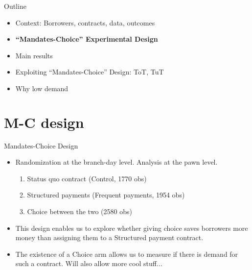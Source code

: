 \documentclass[9pt, aspectratio=169]{beamer}
\begin{document}
\begin{frame}{Outline}
     \large   
     \begin{itemize}
        \item Context: Borrowers, contracts, data, outcomes
         \item \vfill \textbf{``Mandates-Choice'' Experimental Design}
         \vfill\item Main results
          \vfill\item Exploiting ``Mandates-Choice'' Design: ToT, TuT
         \vfill\item Why low demand
         
     \end{itemize}
\end{frame}




\section{M-C design}



\begin{frame}{Mandates-Choice Design}
\label{treatment_arms}
   \begin{itemize}
    \vfill \item Randomization at the branch-day level.  Analysis at the pawn level.
    \begin{enumerate}
        \vfill \item Status quo contract (Control, 1770 obs)
       \vfill \item Structured payments (Frequent payments, 1954 obs)
       \vfill \item Choice between the two (2580 obs)
    \end{enumerate}
       \vfill \item  This design enables us to explore whether giving choice saves borrowers more money than assigning them to a Structured payment contract.
       \vfill \item The existence of a Choice arm allows us to measure if there is demand for such a contract. Will also allow more cool stuff... 
\end{itemize}
\end{frame}
\end{document}
